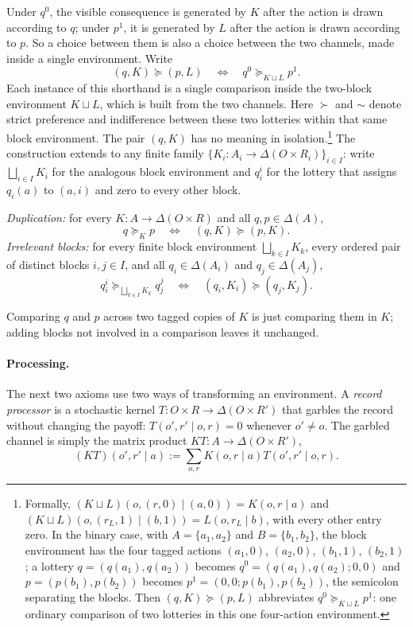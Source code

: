 \documentclass[11pt,a4paper]{article}
\theoremstyle{definition}
\newcommand{\D}{\Delta}
\newcommand{\1}{\mathbf 1}
\begin{document}
Under \(q^0\), the visible consequence is generated by \(K\) after the action is drawn according to \(q\); under \(p^1\), it is generated by \(L\) after the action is drawn according to \(p\). So a choice between them is
also a choice between the two channels, made inside a single environment.
Write
\[
 (q,K)\succeq(p,L)
 \quad\Longleftrightarrow\quad
 q^0\succeq_{K\sqcup L}p^1.
\]
Each instance of this shorthand is a single comparison inside the two-block environment $K\sqcup L$, which is
built from the two channels.  Here $\succ$ and $\sim$ denote strict preference and indifference between these
two lotteries within that same block environment.  The pair $(q,K)$
has no meaning in isolation.\footnote{Formally, $(K\sqcup L)(o,(r,0)\mid(a,0))=K(o,r\mid a)$ and
$(K\sqcup L)(o,(r_L,1)\mid(b,1))=L(o,r_L\mid b)$, with every other entry zero.  In the binary case, with
$A=\{a_1,a_2\}$ and $B=\{b_1,b_2\}$, the block environment has the four tagged actions $(a_1,0)$, $(a_2,0)$,
$(b_1,1)$, $(b_2,1)$; a lottery $q=(q(a_1),q(a_2))$ becomes $q^0=(q(a_1),q(a_2);0,0)$ and $p=(p(b_1),p(b_2))$
becomes $p^1=(0,0;p(b_1),p(b_2))$, the semicolon separating the blocks.  Then $(q,K)\succeq(p,L)$ abbreviates
$q^0\succeq_{K\sqcup L}p^1$: one ordinary comparison of two lotteries in this one four-action environment.}  The construction extends to any finite family
$\{K_i:A_i\to\D(O\times R_i)\}_{i\in I}$: write $\bigsqcup_{i\in I}K_i$ for the analogous block environment and
$q_i^i$ for the lottery that assigns $q_i(a)$ to $(a,i)$ and zero to every other block.

\begin{description}[leftmargin=*,style=sameline]

\item[(A5) Block-comparison coherence.]
\emph{Duplication:} for every $K:A\to\D(O\times R)$ and all $q,p\in\D(A)$,
\[
 q\succeq_Kp
 \quad\Longleftrightarrow\quad
 (q,K)\succeq(p,K).
\]
\emph{Irrelevant blocks:} for every finite block environment $\bigsqcup_{k\in I}K_k$, every ordered pair of
distinct blocks $i,j\in I$, and all $q_i\in\D(A_i)$ and $q_j\in\D(A_j)$,
\[
 q_i^i\succeq_{\bigsqcup_{k\in I}K_k}q_j^j
 \quad\Longleftrightarrow\quad
 (q_i,K_i)\succeq(q_j,K_j).
\]

Comparing $q$ and $p$ across two tagged copies of $K$ is just comparing them in $K$; adding blocks not involved
in a comparison leaves it unchanged.

\end{description}

\paragraph{Processing.}
The next two axioms use two ways of transforming an environment.  A \emph{record processor} is a stochastic
kernel $T:O\times R\to\D(O\times R')$ that garbles the record without changing the payoff:
$T(o',r'\mid o,r)=0$ whenever $o'\neq o$.  The garbled channel is simply the matrix product
$KT:A\to\D(O\times R')$,
\begin{equation}
 (KT)(o',r'\mid a)
 :=\sum_{o,r}K(o,r\mid a)T(o',r'\mid o,r).
 \label{eq:record-processing}
\end{equation}
\end{document}
